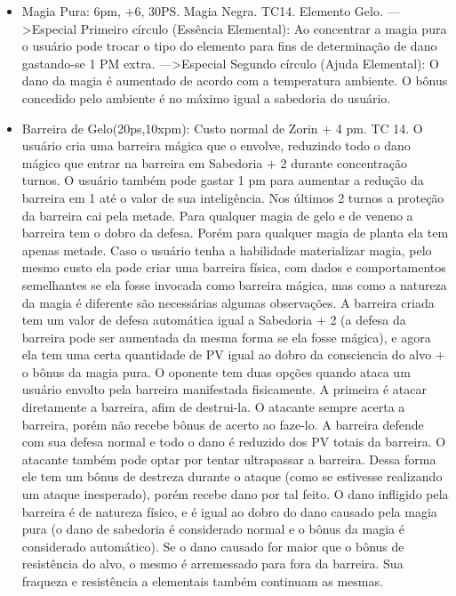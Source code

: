 \begin{itemize}
	\item Magia Pura: 6pm, +6, 30PS. Magia Negra. TC14. Elemento Gelo.\newline
--->Especial Primeiro círculo (Essência Elemental): Ao concentrar a magia pura o usuário pode trocar o tipo do elemento para fins de determinação de dano gastando-se 1 PM extra.\newline
--->Especial Segundo círculo (Ajuda Elemental): O dano da magia é aumentado de acordo com a temperatura ambiente. O bônus concedido pelo ambiente é no máximo igual a sabedoria do usuário.

\item Barreira de Gelo(20ps,10xpm): Custo normal de Zorin + 4 pm. TC 14.\newline
O usuário cria uma barreira mágica que o envolve, reduzindo todo o dano mágico que entrar na barreira em Sabedoria + 2 durante concentração turnos. O usuário também pode gastar 1 pm para aumentar a redução da barreira em 1 até o valor de sua inteligência. Nos últimos 2 turnos a proteção da barreira cai pela metade. Para qualquer magia de gelo e de veneno a barreira tem o dobro da defesa. Porém para qualquer magia de planta ela tem apenas metade. Caso o usuário tenha a habilidade materializar magia, pelo mesmo custo ela pode criar uma barreira física, com dados e comportamentos semelhantes se ela fosse invocada como barreira mágica, mas como a natureza da magia é diferente são necessárias algumas observações. A barreira criada tem um valor de defesa automática igual a Sabedoria + 2 (a defesa da barreira pode ser aumentada da mesma forma se ela fosse mágica), e agora ela tem uma certa quantidade de PV igual ao dobro da consciencia do alvo + o bônus da magia pura. O oponente tem duas opções quando ataca um usuário envolto pela barreira manifestada fisicamente. A primeira é atacar diretamente a barreira, afim de destrui-la. O atacante sempre acerta a barreira, porém não recebe bônus de acerto ao faze-lo. A barreira defende com sua defesa normal e todo o dano é reduzido dos PV totais da barreira. O atacante também pode optar por tentar ultrapassar a barreira. Dessa forma ele tem um bônus de destreza durante o ataque (como se estivesse realizando um ataque inesperado), porém recebe dano por tal feito. O dano infligido pela barreira é de natureza físico, e é igual ao dobro do dano causado pela magia pura (o dano de sabedoria é considerado normal e o bônus da magia é considerado automático). Se o dano causado for maior que o bônus de resistência do alvo, o mesmo é arremessado para fora da barreira. Sua fraqueza e resistência a elementais também continuam as mesmas.



\end{itemize}
